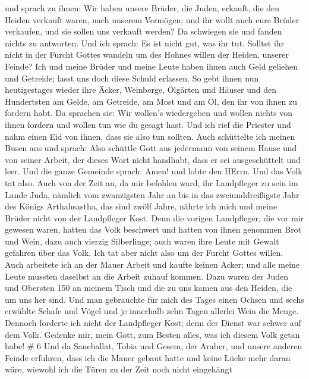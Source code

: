  und sprach zu ihnen: Wir haben unsere Brüder, die Juden,
erkauft, die den Heiden verkauft waren, nach unserem Vermögen; und ihr
wollt auch eure Brüder verkaufen, und sie sollen uns verkauft werden? Da
schwiegen sie und fanden nichts zu antworten.  Und ich
sprach: Es ist nicht gut, was ihr tut. Solltet ihr nicht in der Furcht
Gottes wandeln um des Hohnes willen der Heiden, unserer Feinde?
 Ich und meine Brüder und meine Leute haben ihnen auch Geld
geliehen und Getreide; lasst uns doch diese Schuld erlassen.
 So gebt ihnen nun heutigestages wieder ihre Äcker,
Weinberge, Ölgärten und Häuser und den Hundertsten am Gelde, am
Getreide, am Most und am Öl, den ihr von ihnen zu fordern habt.
 Da sprachen sie: Wir wollen's wiedergeben und wollen
nichts von ihnen fordern und wollen tun wie du gesagt hast. Und ich rief
die Priester und nahm einen Eid von ihnen, dass sie also tun sollten.
 Auch schüttelte ich meinen Busen aus und sprach: Also
schüttle Gott aus jedermann von seinem Hause und von seiner Arbeit, der
dieses Wort nicht handhabt, dass er sei ausgeschüttelt und leer. Und die
ganze Gemeinde sprach: Amen! und lobte den HErrn. Und das Volk tat also.
 Auch von der Zeit an, da mir befohlen ward, ihr
Landpfleger zu sein im Lande Juda, nämlich vom zwanzigsten Jahr an bis
in das zweiunddreißigste Jahr des Königs Arthahsastha, das sind zwölf
Jahre, nährte ich mich und meine Brüder nicht von der Landpfleger Kost.
 Denn die vorigen Landpfleger, die vor mir gewesen waren,
hatten das Volk beschwert und hatten von ihnen genommen Brot und Wein,
dazu auch vierzig Silberlinge; auch waren ihre Leute mit Gewalt gefahren
über das Volk. Ich tat aber nicht also um der Furcht Gottes willen.
 Auch arbeitete ich an der Mauer Arbeit und kaufte keinen
Acker; und alle meine Leute mussten daselbst an die Arbeit zuhauf
kommen.  Dazu waren der Juden und Obersten 150 an meinem
Tisch und die zu uns kamen aus den Heiden, die um uns her sind.
 Und man gebrauchte für mich des Tages einen Ochsen und
sechs erwählte Schafe und Vögel und je innerhalb zehn Tagen allerlei
Wein die Menge. Dennoch forderte ich nicht der Landpfleger Kost; denn
der Dienst war schwer auf dem Volk.  Gedenke mir, mein
Gott, zum Besten alles, was ich diesem Volk getan habe! \# 6
 Und da Saneballat, Tobia und Gesem, der Araber, und unsere
anderen Feinde erfuhren, dass ich die Mauer gebaut hatte und keine Lücke
mehr daran wäre, wiewohl ich die Türen zu der Zeit noch nicht eingehängt
